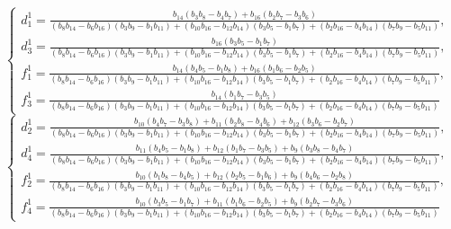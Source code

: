 \begin{equation*}
    \begin{cases}
        d_1^1 = \frac{b_{14} (b_{3} b_{8} - b_{4} b_{7}) + b_{16} (b_{2} b_{7} - b_{3} b_{6})}
        {(b_8 b_{14} - b_6 b_{16})(b_3 b_9 - b_1 b_{11}) + (b_{10} b_{16} - b_{12} b_{14}) (b_3 b_5 - b_1 b_7) + (b_2 b_{16} - b_4 b_{14}) (b_7 b_9 - b_5 b_{11})}, \\
        d_3^1 = \frac{b_{16}(b_{3} b_{5} - b_{1} b_{7})}
        {(b_8 b_{14} - b_6 b_{16})(b_3 b_9 - b_1 b_{11}) + (b_{10} b_{16} - b_{12} b_{14}) (b_3 b_5 - b_1 b_7) + (b_2 b_{16} - b_4 b_{14}) (b_7 b_9 - b_5 b_{11})}, \\
        f_1^1 = \frac{ b_{14}(b_{4} b_{5} - b_{1} b_{8}) + b_{16}(b_{1} b_{6} - b_{2} b_{5})}
        {(b_8 b_{14} - b_6 b_{16})(b_3 b_9 - b_1 b_{11}) + (b_{10} b_{16} - b_{12} b_{14}) (b_3 b_5 - b_1 b_7) + (b_2 b_{16} - b_4 b_{14}) (b_7 b_9 - b_5 b_{11})}, \\
        f_3^1 = \frac{ b_{14}(b_{1} b_{7} - b_{3} b_{5})}
        {(b_8 b_{14} - b_6 b_{16})(b_3 b_9 - b_1 b_{11}) + (b_{10} b_{16} - b_{12} b_{14}) (b_3 b_5 - b_1 b_7) + (b_2 b_{16} - b_4 b_{14}) (b_7 b_9 - b_5 b_{11})}
    \end{cases}
\end{equation*}
\begin{equation*}
    \begin{cases}
        d_2^1 = \frac{b_{10}(b_{4} b_{7} - b_{3} b_{8}) + b_{11}(b_{2} b_{8} - b_{4} b_{6}) + b_{12}(b_{3} b_{6} - b_{2} b_{7})}
        {(b_8 b_{14} - b_6 b_{16})(b_3 b_9 - b_1 b_{11}) + (b_{10} b_{16} - b_{12} b_{14}) (b_3 b_5 - b_1 b_7) + (b_2 b_{16} - b_4 b_{14}) (b_7 b_9 - b_5 b_{11})}, \\
        d_4^1 = \frac{b_{11}(b_{4} b_{5} - b_{1} b_{8}) + b_{12}(b_{1} b_{7} - b_{3} b_{5}) + b_{9}(b_{3} b_{8} - b_{4} b_{7})}
        {(b_8 b_{14} - b_6 b_{16})(b_3 b_9 - b_1 b_{11}) + (b_{10} b_{16} - b_{12} b_{14}) (b_3 b_5 - b_1 b_7) + (b_2 b_{16} - b_4 b_{14}) (b_7 b_9 - b_5 b_{11})}, \\
        f_2^1 = \frac{b_{10}(b_{1} b_{8} -  b_{4} b_{5}) + b_{12} (b_{2} b_{5} - b_{1} b_{6}) + b_{9}(b_{4} b_{6} - b_{2} b_{8})}
        {(b_8 b_{14} - b_6 b_{16})(b_3 b_9 - b_1 b_{11}) + (b_{10} b_{16} - b_{12} b_{14}) (b_3 b_5 - b_1 b_7) + (b_2 b_{16} - b_4 b_{14}) (b_7 b_9 - b_5 b_{11})}, \\
        f_4^1 = \frac{b_{10}(b_{3} b_{5} - b_{1} b_{7}) + b_{11}(b_{1} b_{6} - b_{2} b_{5}) + b_{9}(b_{2} b_{7} - b_{3} b_{6})}
        {(b_8 b_{14} - b_6 b_{16})(b_3 b_9 - b_1 b_{11}) + (b_{10} b_{16} - b_{12} b_{14}) (b_3 b_5 - b_1 b_7) + (b_2 b_{16} - b_4 b_{14}) (b_7 b_9 - b_5 b_{11})}
    \end{cases}
\end{equation*}


